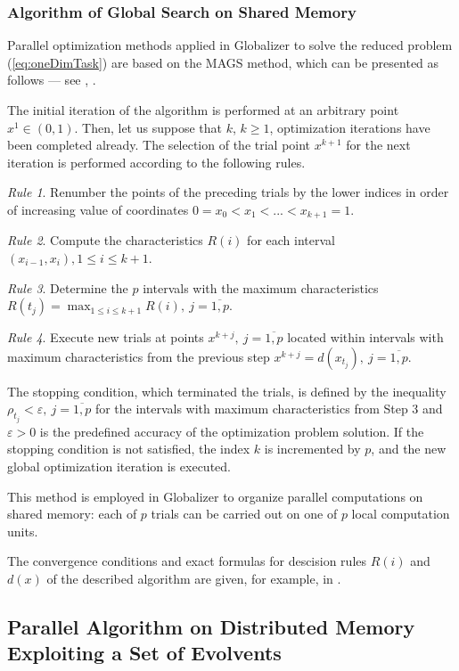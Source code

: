 \documentclass{svproc}
\begin{document}
\subsubsection{Algorithm of Global Search on Shared Memory}
\label{sub:ags}
Parallel optimization methods applied in Globalizer to solve the reduced problem
(\ref{eq:oneDimTask}) are based on the MAGS method, which can be presented as follows ---
see \cite{strongin1978}, \cite{strSergGO}.
\par
The initial iteration of the algorithm is performed at an arbitrary point \mbox{\(x^1\in(0,1)\)}.
Then, let us suppose that \(k\), \(k\ge 1\), optimization iterations have been completed already.
The selection of the trial point \(x^{k+1}\) for the next iteration is performed according to the
following rules.

\textit{Rule 1}. Renumber the points of the preceding trials by the lower indices in order of
increasing value of coordinates
$0=x_0<x_1<...<x_{k+1}=1$.

\textit{Rule 2}. Compute the characteristics \(R(i)\) for each interval \((x_{i-1},x_i),1\leq i\leq
k+1\).

\textit{Rule 3}. Determine the \(p\) intervals with the maximum characteristics $R(t_j)=\max_{1\leq i
\leq k+1}R(i),\: j=\overline{1,p}$.

\textit{Rule 4}. Execute new trials at points \(x^{k+j},\: j=\overline{1,p}\) located within intervals with
maximum characteristics from the previous step
  $x^{k+j}=d(x_{t_j}),\: j=\overline{1,p}$.

The stopping condition, which terminated the trials, is defined by the inequality
$\rho_{t_j}<\varepsilon,\: j=\overline{1,p}$
for the intervals with maximum characteristics from Step 3 and \(\varepsilon >0\) is the
predefined accuracy of the optimization problem solution. If the stopping condition is not satisfied,
the index \(k\) is incremented by \(p\), and the new global optimization iteration is executed.

This method is employed in Globalizer to organize parallel computations on shared memory: each of \(p\)
trials can be carried out on one of \(p\) local computation units.

The convergence conditions and exact formulas for descision rules $R(i)$ and $d(x)$ of the
described algorithm are given, for example, in \cite{strSergGO}.

\subsection{Parallel Algorithm on Distributed Memory Exploiting a Set of Evolvents}
\label{sub:parallel_evolvents}
\end{document}
